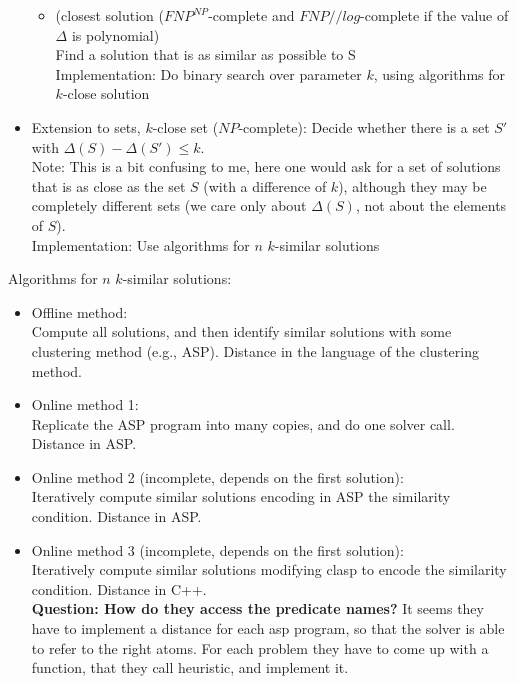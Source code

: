 \begin{itemize}
    \begin{itemize}
    \item
        (closest solution ($FNP^{NP}$-complete and $FNP//log$-complete if the value of $\Delta$ is polynomial) \\ 
        Find a solution that is as similar as possible to S
        \\Implementation:
        Do binary search over parameter $k$, using algorithms for $k$-close solution
    \end{itemize}
\item
    Extension to sets, $k$-close set ($NP$-complete):
    Decide whether there is a set $S'$ with $\Delta(S) - \Delta(S') \leq k$.
    \\
    Note: This is a bit confusing to me, here one would ask for a set of solutions that is as close
    as the set $S$ (with a difference of $k$), although they may  be completely different sets 
    (we care only about $\Delta(S)$, not about the elements of $S$).
    \\
    Implementation: Use algorithms for $n$ $k$-similar solutions
\end{itemize}


\flushleft Algorithms for $n$ $k$-similar solutions:
\begin{itemize}
\item 
    Offline method:\\
    Compute all solutions, and then identify similar solutions with some clustering method (e.g., ASP).
    Distance in the language of the clustering method.
\item
    Online method 1:\\
    Replicate the ASP program into many copies, and do one solver call. 
    Distance in ASP.
\item 
    Online method 2 (incomplete, depends on the first solution):\\
    Iteratively compute similar solutions encoding in ASP the similarity condition.
    Distance in ASP.
\item
    Online method 3 (incomplete, depends on the first solution):\\
    Iteratively compute similar solutions modifying clasp to encode the similarity condition.
    Distance in C++.
    \\
    \textbf{Question: How do they access the predicate names?}
    It seems they have to implement a distance for each asp program, 
    so that the solver is able to refer to the right atoms.
    For each problem they have to come up with a function, 
    that they call heuristic, and implement it.
\end{itemize}

